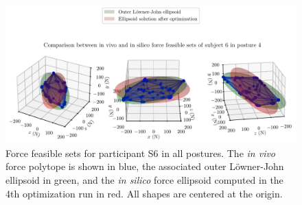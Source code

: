 \begin{figure}[!htb]
\begin{minipage}{1\linewidth}
        \captionsetup{justification=centering}
        \centering
        \includegraphics[trim=0 0 0 60, clip, width=0.8\linewidth]{img/chapter_5/subject_251_solution_4_posture_4.pdf}
    \end{minipage}
    \caption{Force feasible sets for participant S6 in all postures. The \emph{in vivo} force polytope is shown in blue, the associated outer Löwner-John ellipsoid in green, and the \emph{in silico} force ellipsoid computed in the 4th optimization run in red. All shapes are centered at the origin.}
    \label{fig:sub6_4thsol}
\end{figure}


